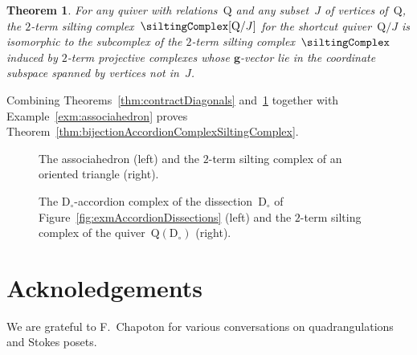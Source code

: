 \documentclass{amsart}
\newtheorem{theorem}{Theorem}%
\theoremstyle{definition}
\renewcommand{\b}[1]{\mathbf{#1}} %
\newcommand{\fref}[1]{Figure~\ref{#1}} %
\newcommand{\vincent}[1]{\todo[color=blue!30]{#1 \\ \hfill --- V.}}
\newcommand{\dissection}{\mathrm{D}} %
\newcommand{\quiver}{\mathrm{Q}} %
\begin{document}
\begin{theorem}
\label{thm:contractVertices}
For any quiver with relations~$\quiver$ and any subset~$J$ of vertices of~$\quiver$, the $2$-term silting complex~$\siltingComplex[\quiver/J]$ for the shortcut quiver~$\quiver/J$ is isomorphic to the subcomplex of the $2$-term silting complex~$\siltingComplex$ induced by $2$-term projective complexes whose $\b{g}$-vector lie in the coordinate subspace spanned by vertices not in~$J$.
\end{theorem}

Combining Theorems~\ref{thm:contractDiagonals} and~\ref{thm:contractVertices} together with Example~\ref{exm:associahedron} proves Theorem~\ref{thm:bijectionAccordionComplexSiltingComplex}.

\vincent{Fans}

\begin{figure}
	\capstart
	\centerline{\associahedronAccordionTikz{}\associahedronSiltingTikz{}}
	\caption{The associahedron (left) and the $2$-term silting complex of an oriented triangle (right).}
	\label{fig:associahedron}
\end{figure}

\begin{figure}
	\capstart
	\centerline{\accordiohedronAccordionTikz{}\accordiohedronSiltingTikz{}}
	\caption{The $\dissection_\circ$-accordion complex of the dissection~$\dissection_\circ$ of \fref{fig:exmAccordionDissections} (left) and the $2$-term silting complex of the quiver~$\quiver(\dissection_\circ)$ (right).}
	\label{fig:accordiohedron}
\end{figure}





\section*{Acknoledgements}

We are grateful to F.~Chapoton for various conversations on quadrangulations and Stokes posets.




\label{sec:biblio}
\end{document}
